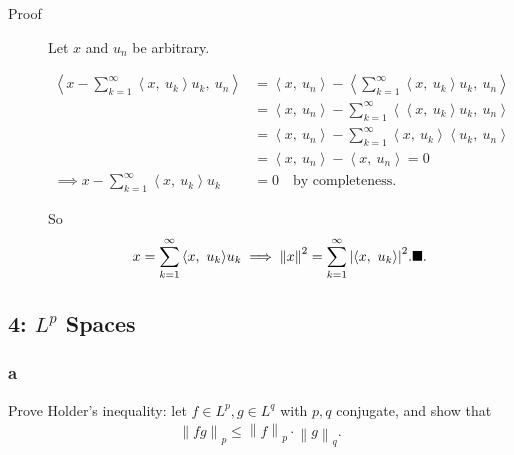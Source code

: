 \begin{description}
\item[Proof]
Let \(x\) and \(u_n\) be arbitrary.

\begin{align*} {\left\langle {x - \sum_{k=1}^\infty {\left\langle {x},~{u_k} \right\rangle}u_k },~{u_n} \right\rangle} &= {\left\langle {x},~{u_n} \right\rangle} - {\left\langle {\sum_{k=1}^\infty {\left\langle {x},~{u_k} \right\rangle}u_k },~{u_n} \right\rangle} \\ &= {\left\langle {x},~{u_n} \right\rangle} - \sum_{k=1}^\infty  {\left\langle {{\left\langle {x},~{u_k} \right\rangle}u_k },~{u_n} \right\rangle} \\ &= {\left\langle {x},~{u_n} \right\rangle} - \sum_{k=1}^\infty  {\left\langle {x},~{u_k} \right\rangle} {\left\langle {u_k },~{u_n} \right\rangle} \\ &= {\left\langle {x},~{u_n} \right\rangle} - {\left\langle {x},~{u_n} \right\rangle} = 0 \\ \implies  x - \sum_{k=1}^\infty {\left\langle {x},~{u_k} \right\rangle}u_k &= 0 \quad\text{by completeness} .\end{align*}

So
\begin{align*} x = \sum_{k=1}^\infty {\left\langle {x},~{u_k} \right\rangle} u_k \implies {\left\lVert {x} \right\rVert}^2 = \sum_{k=1}^\infty {\left\lvert {{\left\langle {x},~{u_k} \right\rangle}} \right\rvert}^2. \hfill\blacksquare .\end{align*}
\end{description}

\hypertarget{lp-spaces}{%
\subsection{\texorpdfstring{4: \(L^p\)
Spaces}{4: L\^{}p Spaces}}\label{lp-spaces}}

\hypertarget{a-4}{%
\subsubsection{a}\label{a-4}}

Prove Holder's inequality: let \(f\in L^p, g\in L^q\) with \(p, q\)
conjugate, and show that
\begin{align*} {\left\lVert {fg} \right\rVert}_{p} \leq {\left\lVert {f} \right\rVert}_{p} \cdot {\left\lVert {g} \right\rVert}_{q} .\end{align*}

